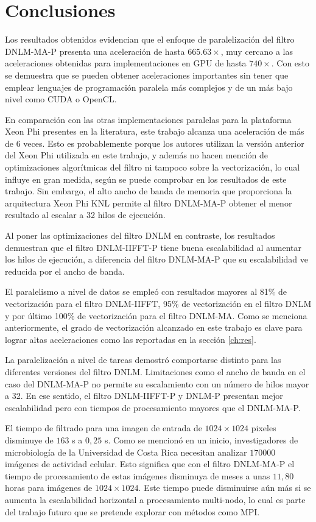 \chapter{Conclusiones}
\label{ch:concl}

Los resultados obtenidos evidencian que el enfoque de paralelización del filtro DNLM-MA-P presenta una aceleración de hasta $665.63\times$, muy cercano a las aceleraciones obtenidas para implementaciones en GPU de hasta $740\times$. Con esto se demuestra que se pueden obtener aceleraciones importantes sin tener que emplear lenguajes de programación paralela más complejos y de un más bajo nivel como CUDA o OpenCL.


En comparación con las otras implementaciones paralelas para la plataforma Xeon Phi presentes en la literatura, este trabajo alcanza una aceleración de más de 6 veces. Esto es probablemente porque los autores utilizan la versión anterior del Xeon Phi utilizada en este trabajo, y además no hacen mención de optimizaciones algorítmicas del filtro ni tampoco sobre la vectorización, lo cual influye en gran medida, según se puede comprobar en los resultados de este trabajo. Sin embargo, el alto ancho de banda de memoria que proporciona la arquitectura Xeon Phi KNL permite al filtro DNLM-MA-P obtener el menor resultado al escalar a 32 hilos de ejecución.

Al poner las optimizaciones del filtro DNLM en contraste, los resultados demuestran que el filtro DNLM-IIFFT-P tiene buena escalabilidad al aumentar los hilos de ejecución, a diferencia del filtro DNLM-MA-P que su escalabilidad ve reducida por el ancho de banda. 

El paralelismo a nivel de datos se empleó con resultados mayores al 81\% de vectorización para el filtro DNLM-IIFFT, 95\% de vectorización en el filtro DNLM y por último 100\% de vectorización para el filtro DNLM-MA. Como se menciona anteriormente, el grado de vectorización alcanzado en este trabajo es clave para lograr altas aceleraciones como las reportadas en la sección \ref{ch:res}.

La paralelización a nivel de tareas demostró comportarse distinto para las diferentes versiones del filtro DNLM. Limitaciones como el ancho de banda en el caso del DNLM-MA-P no permite su escalamiento con un número de hilos mayor a 32. En ese sentido, el filtro DNLM-IIFFT-P y DNLM-P presentan mejor escalabilidad pero con tiempos de procesamiento mayores que el DNLM-MA-P.

El tiempo de filtrado para una imagen de entrada de $1024\times1024$ pixeles disminuye de $163$ s a $0,25$ s. Como se mencionó en un inicio, investigadores de microbiología de la Universidad de Costa Rica necesitan analizar $170000$ imágenes de actividad celular. Esto significa que con el filtro DNLM-MA-P el tiempo de procesamiento de estas imágenes disminuya de meses a unas $11,80$ horas para imágenes de $1024\times1024$. Este tiempo puede disminuirse aún más si se aumenta la escalabilidad horizontal a procesamiento multi-nodo, lo cual es parte del trabajo futuro que se pretende explorar con métodos como MPI.

